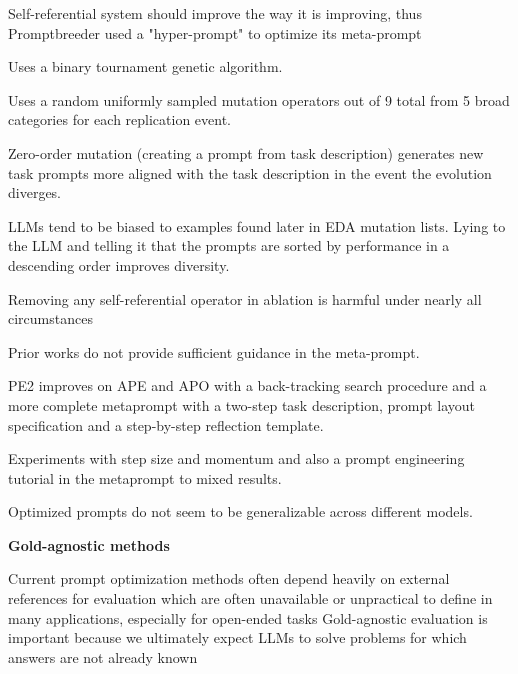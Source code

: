 Self-referential system should improve the way it is improving, thus Promptbreeder used a "hyper-prompt" to optimize its meta-prompt \cite{fernando2023promptbreederselfreferentialselfimprovementprompt}

Uses a binary tournament genetic algorithm. \cite{fernando2023promptbreederselfreferentialselfimprovementprompt}

Uses a random uniformly sampled mutation operators out of 9 total from 5 broad categories for each replication event. \cite{fernando2023promptbreederselfreferentialselfimprovementprompt}

Zero-order mutation (creating a prompt from task description) generates new task prompts more aligned with the task description in the event the evolution diverges.  \cite{fernando2023promptbreederselfreferentialselfimprovementprompt}

LLMs tend to be biased to examples found later in EDA mutation lists. Lying to the LLM and telling it that the prompts are sorted by performance in a descending order improves diversity.  \cite{fernando2023promptbreederselfreferentialselfimprovementprompt}

Removing any self-referential operator in ablation is harmful under nearly all circumstances \cite{fernando2023promptbreederselfreferentialselfimprovementprompt}


Prior works do not provide sufficient guidance in the meta-prompt. \cite{ye2024promptengineeringpromptengineer}

PE2 improves on APE and APO with a back-tracking search procedure and a more complete metaprompt with a two-step task description, prompt layout specification and a step-by-step reflection template. \cite{ye2024promptengineeringpromptengineer}

Experiments with step size and momentum and also a prompt engineering tutorial in the metaprompt to mixed results. \cite{ye2024promptengineeringpromptengineer}

Optimized prompts do not seem to be generalizable across different models.  \cite{ye2024promptengineeringpromptengineer}


\textbf{Gold-agnostic methods}

Current prompt optimization methods often depend heavily on external references for evaluation which are often unavailable or unpractical to define in many applications, especially for open-ended tasks \cite{xiang2025selfsupervisedpromptoptimization}
Gold-agnostic evaluation is important because we ultimately expect LLMs to solve problems for which answers are not already known \cite{zhang2024glapegoldlabelagnosticprompt}


